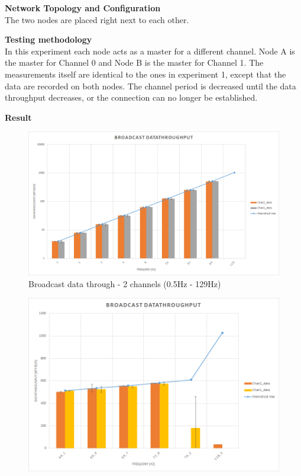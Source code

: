 \begin{description}
	\item{\textbf{Network Topology and Configuration}} \hfill \\ The two nodes are placed right next to each other.
	\item{\textbf{Testing methodology}} \hfill \\ In this experiment each node acts as a master for a different channel. Node A is the master for Channel 0 and Node B is the master for Channel 1. The measurements itself are identical to the ones in experiment 1, except that the data are recorded on both nodes. The channel period is decreased until the data throughput decreases, or the connection can no longer be established.
	\item{\textbf{Result}} \hfill \\  	
	\begin{figure}[H]
		\centering
		\includegraphics[scale=0.5]{./pics/exp2_norm.png}
		\caption{Broadcast data through - 2 channels (0.5Hz - 129Hz)}\label{fig:exp2low}
	\end{figure}
	\begin{figure}[H]
		\centering
		\includegraphics[scale=0.5]{./pics/exp2_detail.png}

\end{figure}
\end{description}
